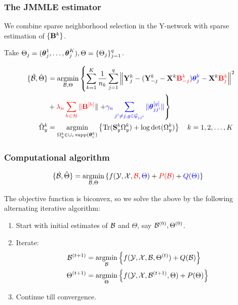 \documentclass[10pt]{beamer}
\theoremstyle{definition}
\DeclareMathOperator*{\Tr}{Tr}
\DeclareMathOperator*{\argmin}{argmin}
\DeclareMathOperator*{\supp}{\text{supp}}
\begin{document}
\begin{frame}
\frametitle{The JMMLE estimator}
We combine sparse neighborhood selection in the Y-network with sparse estimation of $\{ {\mathbf{B}}^k \}$.

Take $\Theta_j = ({\boldsymbol{\theta}}_j^1, \ldots, {\boldsymbol{\theta}}_j^K), \Theta = \{ \Theta_j \}_{j=1}^q$.

\begin{align*}
\{ \hat \cB, \hat \Theta \} &=
\argmin_{\cB, \Theta} \left\{ \sum_{k=1}^K \frac{1}{n_k} \sum_{j=1}^q
\left\| \bfY_j^k - ( \bfY_{-j}^k - \bfX^k {\colr \bfB_{-j}^k}) {\colb \bftheta_j^k}
- \bfX^k {\colr \bfB_j^k} \right\|^2 \right.\\
& + {\colr \lambda_n \sum_{h \in \cH} \| \bfB^{[h]}} \|
\left. + {\colb \gamma_n  \sum_{j' \neq j, g \in \cG_{jj'}} \| \bftheta_{jj'}^{[g]} \|} \right\}\\
\hat \Omega_y^k &= \argmin_{\Omega_y^k \in \cup_i \supp (\bftheta_i^k)}
\left\{ \Tr (\bfS_y^k \Omega_y^k ) + \log \det (\Omega_y^k ) \right\}
\quad k = 1, 2, \ldots, K
\end{align*}
\end{frame}
\begin{frame}
\frametitle{Computational algorithm}
\begin{align*}
\{ \hat \cB, \hat \Theta \} &= \argmin_{\cB, \Theta}
\left\{ f(\cY, \cX, {\colr \cB}, {\colb \Theta}) + {\colr P(\cB)} + {\colb Q(\Theta)} \right\}
\end{align*}

The objective function is biconvex, so we solve the above by the following alternating iterative algorithm:

\begin{enumerate}
\item Start with initial estimates of ${\cal{B}}$ and $\Theta$, say ${\cal{B}}^{(0)}, \Theta^{(0)}$.
\item Iterate:
%
\begin{align*}
\cB^{(t+1)} &= \argmin_\cB \left\{ f ( \cY, \cX, \cB, \Theta^{(t)}) + Q (\cB) \right\}\\
\Theta^{(t+1)} &= \argmin_\Theta \left\{ f ( \cY, \cX, \cB^{(t+1)}, \Theta) + P (\Theta) \right\}
\end{align*}
\item Continue till convergence.
\end{enumerate}
\end{frame}
\end{document}
